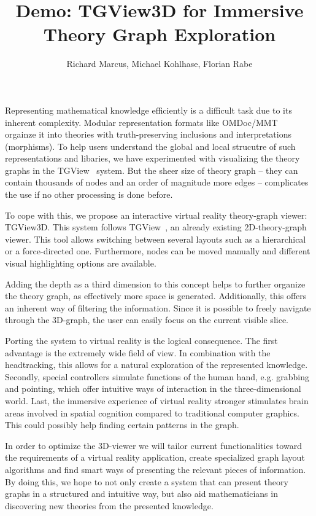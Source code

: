 \documentclass{llncs}
\title{Demo: TGView3D for Immersive Theory Graph Exploration}
\author{Richard Marcus, Michael Kohlhase, Florian Rabe}
\institute{Computer Science, FAU Erlangen-N\"urnberg}
\begin{document}
\maketitle

Representing mathematical knowledge efficiently is a difficult task due to its inherent complexity.
Modular representation formats like OMDoc/MMT~\cite{Kohlhase:OMDoc1.2,RabKoh:WSMSML13} orgainze it into theories with truth-preserving inclusions and interpretations (morphisms).
To help users understand the global and local strucutre of such representations and libaries, we have experimented with visualizing the theory graphs in the TGView~\cite{RupKohMue:fitgv17} system. But the sheer size of theory graph -- they can contain thousands of nodes and an order of magnitude more edges -- complicates the use if no other processing is done before.

To cope with this, we propose an interactive virtual reality theory-graph viewer: TGView3D. This system follows TGView~\cite{RupKohMue:fitgv17}, an already existing 2D-theory-graph viewer. This tool allows switching between several layouts such as a hierarchical or a force-directed one. Furthermore, nodes can be moved manually and different visual highlighting options are available.

Adding the depth as a third dimension to this concept helps to further organize the theory graph, as effectively more space is generated. Additionally, this offers an inherent way of filtering the information. Since it is possible to freely navigate through the 3D-graph, the user can easily focus on the current visible slice.

Porting the system to virtual reality is the logical consequence. The first advantage is the extremely wide field of view. In combination with the headtracking, this allows for a natural exploration of the represented knowledge. Secondly, special controllers simulate functions of the human hand, e.g. grabbing and pointing, which offer intuitive ways of interaction in the three-dimensional world. Last, the immersive experience of virtual reality stronger stimulates brain areas involved in spatial cognition compared to traditional computer graphics. This could possibly help finding certain patterns in the graph.

In order to optimize the 3D-viewer we will tailor current functionalities toward the
requirements of a virtual reality application, create specialized graph layout algorithms
and find smart ways of presenting the relevant pieces of information. By doing this, we
hope to not only create a system that can present theory graphs in a structured and
intuitive way, but also aid mathematicians in discovering new theories from the presented
knowledge.

\printbibliography
\end{document}
